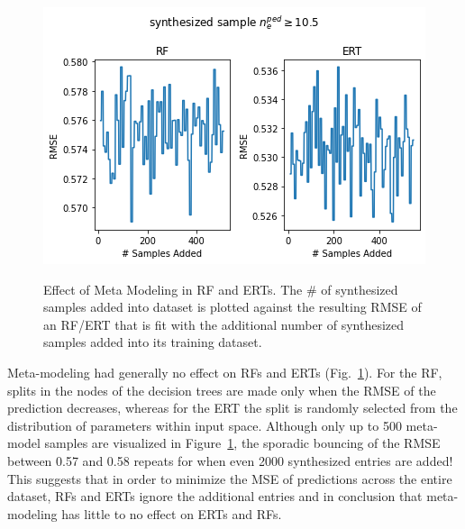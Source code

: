 \documentclass[a4paper, twoside, final, 12pt]{article}
\begin{document}
{\begin{figure}
		\centering
		\vspace{-18pt}
		\caption{Effect of Meta Modeling in RF and ERTs. The \# of synthesized samples added into dataset is plotted against the resulting RMSE of an RF/ERT that is fit with the additional number of synthesized samples added into its training dataset.}
		\includegraphics[width=\linewidth, keepaspectratio=true, trim=0 0 0 30, clip]{./src/ERT_vs_RF_meta_modeling}
		\vspace{-22pt}
		\label{fig:RF_meta_model}
\end{figure}
Meta-modeling had generally no effect on RFs and ERTs (Fig.~\ref{fig:RF_meta_model}).
For the RF, splits in the nodes of the decision trees are made only when the RMSE of the prediction decreases, whereas for the ERT the split is randomly selected from the distribution of parameters within input space.
Although only up to 500 meta-model samples are visualized in Figure~\ref{fig:RF_meta_model}, the sporadic bouncing of the RMSE between 0.57 and 0.58 repeats for when even 2000 synthesized entries are added!
This suggests that in order to minimize the MSE of predictions across the entire dataset, RFs and ERTs ignore the additional entries and in  conclusion that meta-modeling has little to no effect on ERTs and RFs.

}
\end{document}

